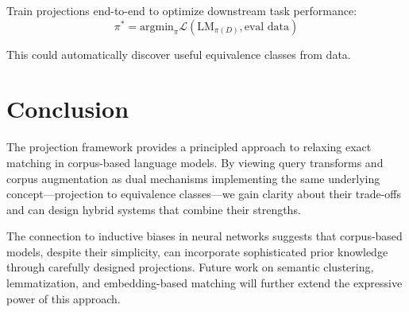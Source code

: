 \documentclass[11pt]{article}
\begin{document}
Train projections end-to-end to optimize downstream task performance:
\begin{equation}
\pi^* = \text{argmin}_\pi \mathcal{L}(\text{LM}_{\pi(D)}, \text{eval data})
\end{equation}

This could automatically discover useful equivalence classes from data.

\section{Conclusion}

The projection framework provides a principled approach to relaxing exact matching in corpus-based language models. By viewing query transforms and corpus augmentation as dual mechanisms implementing the same underlying concept---projection to equivalence classes---we gain clarity about their trade-offs and can design hybrid systems that combine their strengths.

The connection to inductive biases in neural networks suggests that corpus-based models, despite their simplicity, can incorporate sophisticated prior knowledge through carefully designed projections. Future work on semantic clustering, lemmatization, and embedding-based matching will further extend the expressive power of this approach.



\end{document}
